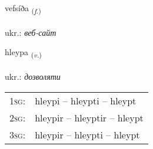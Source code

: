 \documentclass[frontgrid, backgrid]{flacards}\usepackage[]{graphicx}\usepackage[]{xcolor}
\begin{document}
\renewcommand{\flhead}{\vskip5pt \fboxsep=0pt {\small\bfseries\footnotesize Nafnorð | іменник}}
\renewcommand{\fcfoot}{\vskip5pt \fboxsep=0pt \hspace{2pt}{\small\bfseries\footnotesize 2K}}

\renewcommand{\blhead}{\vskip5pt {\small\bfseries\footnotesize Nafnorð | іменник }}
\renewcommand{\bcfoot}{\vskip5pt \hspace{2pt}{\small\bfseries\footnotesize 2K}}


{vefsíða \small{\textsubscript{(\textit{f.})}} \\[1ex] %
\textphonetic{[vɛfsiða]} \\
ukr.: \emph{веб-сайт} \\  [2ex]
\renewcommand*{\arraystretch}{0.8}
}

\renewcommand{\flhead}{\vskip5pt \fboxsep=0pt {\small\bfseries\footnotesize Sagnorð | дієслово}}
\renewcommand{\fcfoot}{\vskip5pt \fboxsep=0pt \hspace{2pt}{\small\bfseries\footnotesize 2K}}

\renewcommand{\blhead}{\vskip5pt {\small\bfseries\footnotesize Sagnorð | дієслово }}
\renewcommand{\bcfoot}{\vskip5pt \hspace{2pt}{\small\bfseries\footnotesize 2K}}


{hleypa \small{\textsubscript{(\textit{v.})}} \\[1ex] %
\textphonetic{[l̥eiːpa]} \\
ukr.: \emph{дозволяти} \\  [2ex]
\renewcommand*{\arraystretch}{0.8}
\begin{tabular}{p{1cm}l}
\textsc{1sg}: & hleypi -- hleypti -- hleypt \\ 
\textsc{2sg}: & hleypir -- hleyptir -- hleypt \\ 
\textsc{3sg}: & hleypir -- hleypti -- hleypt \\ 
\end{tabular}
}
\end{document}

